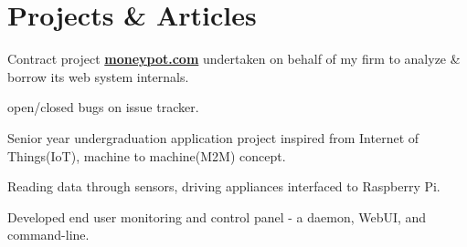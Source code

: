 \documentclass[]{deedy-resume-openfont}
\begin{document}
\begin{minipage}[t]{0.66\textwidth}

\section{Projects \& Articles}
\begin{tightemize}
\item Contract project \href{http://swlogs.me/blog/the-moneypot-project/}{\textbf{moneypot.com}} undertaken on
  behalf of my firm to analyze \& borrow its web system internals.
\item open/closed bugs on issue tracker.

\end{tightemize}
\sectionsep

\descript{}
\begin{tightemize}
\item Senior year undergraduation application project inspired from Internet of Things(IoT),
  machine to machine(M2M) concept.
\item Reading data through sensors, driving appliances interfaced to Raspberry Pi.
\item Developed end user monitoring and control panel - a daemon, WebUI, and command-line.
\end{tightemize}
\sectionsep


\end{minipage}
\end{document}
